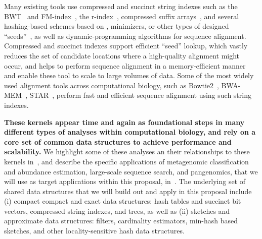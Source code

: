 \begin{itemize}
Many existing tools use compressed and succinct string indexes such as the BWT~\cite{burrows1994block} and FM-index~\cite{ferragina2000opportunistic}, the r-index~\cite{gagie2018optimal}, compressed suffix arrays~\cite{grossi2000compressed}, and several hashing-based schemes based on \kmers, minimizers, or other types of designed ``seeds''~\cite{li2018minimap2,pibiri2022sparse,sahlin2022strobealign}, as well as dynamic-programming algorithms for sequence alignment.
Compressed and succinct indexes support efficient ``seed'' lookup, which vastly reduces the set of candidate locations where a high-quality alignment might occur, and helps to perform sequence alignment in a memory-efficient manner and enable these tool to scale to large volumes of data.
Some of the most widely used alignment tools across computational biology, such as Bowtie2~\cite{Langmead2012}, BWA-MEM~\cite{li2013aligning}, STAR~\cite{Dobin2012}, perform fast and efficient sequence alignment using such string indexes.
\end{itemize}

\noindent
\textbf{These kernels appear time and again as foundational steps in many different types of analyses within computational biology, and rely on a core set of common data structures to achieve performance and scalability.}  We highlight some of these analyses an their relationships to these kernels in~, and describe the specific applications of metagenomic classification and abundance estimation, large-scale sequence search, and pangenomics, that we will use as target applications within this proposal, in~. The underlying set of shared data structures that we will build out and apply in this proposal include (i) compact compact and exact data structures: hash tables and succinct bit vectors, compressed string indexes, and trees, as well as (ii) sketches and approximate data structures: filters, cardinality estimators,  min-hash based sketches, and other locality-sensitive hash data structures.


